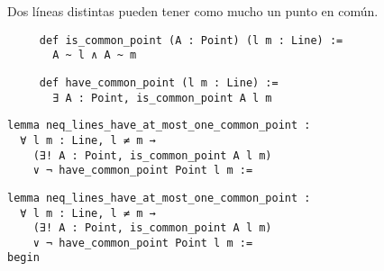 \begin{frame}[fragile]
	\begin{prop}
		Dos líneas distintas pueden tener como mucho un punto en común.
	\end{prop}
	\vspace{1em}
	\pause
	\begin{lstlisting}
     def is_common_point (A : Point) (l m : Line) := 
       A ~ l ∧ A ~ m 
	\end{lstlisting}
	\pause
	\begin{lstlisting}
     def have_common_point (l m : Line) := 
       ∃ A : Point, is_common_point A l m
	\end{lstlisting}
\end{frame}










\begin{frame}[fragile]
	\begin{multicols}{2}
		\begin{lstlisting}
lemma neq_lines_have_at_most_one_common_point :
  ∀ l m : Line, l ≠ m → 
    (∃! A : Point, is_common_point A l m) 
    ∨ ¬ have_common_point Point l m := 
\end{lstlisting}
		\columnbreak
		\hfill
	\end{multicols}
\end{frame}










\begin{frame}[fragile]
	\begin{multicols}{2}
		\begin{lstlisting}
lemma neq_lines_have_at_most_one_common_point :
  ∀ l m : Line, l ≠ m → 
    (∃! A : Point, is_common_point A l m) 
    ∨ ¬ have_common_point Point l m := 
begin
\end{lstlisting}
		\columnbreak
		\begin{lstlisting}

		\end{lstlisting}
	\end{multicols}
\end{frame}










